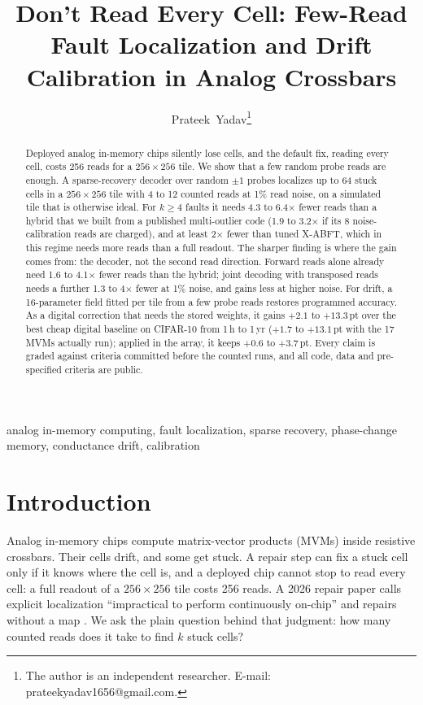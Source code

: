 \documentclass[journal]{IEEEtran}
\newcommand{\pt}{\,pt}
\begin{document}
\title{Don't Read Every Cell: Few-Read Fault Localization and Drift Calibration in Analog Crossbars}

\author{Prateek~Yadav\thanks{The author is an independent researcher. E-mail: prateekyadav1656@gmail.com.}}

\maketitle

\begin{abstract}
Deployed analog in-memory chips silently lose cells, and the default fix, reading every cell, costs 256 reads for a $256\times256$ tile.
We show that a few random probe reads are enough.
A sparse-recovery decoder over random $\pm1$ probes localizes up to 64 stuck cells in a $256\times256$ tile with 4 to 12 counted reads at 1\% read noise, on a simulated tile that is otherwise ideal.
For $k\ge4$ faults it needs 4.3 to 6.4$\times$ fewer reads than a hybrid that we built from a published multi-outlier code (1.9 to 3.2$\times$ if its 8 noise-calibration reads are charged), and at least 2$\times$ fewer than tuned X-ABFT, which in this regime needs more reads than a full readout.
The sharper finding is where the gain comes from: the decoder, not the second read direction. Forward reads alone already need 1.6 to 4.1$\times$ fewer reads than the hybrid; joint decoding with transposed reads needs a further 1.3 to 4$\times$ fewer at 1\% noise, and gains less at higher noise.
For drift, a 16-parameter field fitted per tile from a few probe reads restores programmed accuracy. As a digital correction that needs the stored weights, it gains $+2.1$ to $+13.3$\pt{} over the best cheap digital baseline on CIFAR-10 from 1\,h to 1\,yr ($+1.7$ to $+13.1$\pt{} with the 17 MVMs actually run); applied in the array, it keeps $+0.6$ to $+3.7$\pt.
Every claim is graded against criteria committed before the counted runs, and all code, data and pre-specified criteria are public.
\end{abstract}

\begin{IEEEkeywords}
analog in-memory computing, fault localization, sparse recovery, phase-change memory, conductance drift, calibration
\end{IEEEkeywords}

\section{Introduction}
Analog in-memory chips compute matrix-vector products (MVMs) inside resistive crossbars. Their cells drift, and some get stuck. A repair step can fix a stuck cell only if it knows where the cell is, and a deployed chip cannot stop to read every cell: a full readout of a $256\times256$ tile costs 256 reads. A 2026 repair paper calls explicit localization ``impractical to perform continuously on-chip'' and repairs without a map \cite{star2026}. We ask the plain question behind that judgment: how many counted reads does it take to find $k$ stuck cells?
\end{document}
